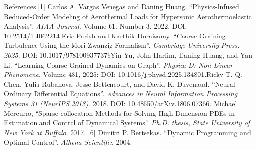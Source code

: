 \begin{frame}{References}
    \tiny
    [1] Carlos A. Vargas Venegas and Daning Huang. ``Physics-Infused Reduced-Order Modeling of Aerothermal Loads for Hypersonic Aerothermoelastic Analysis''. \emph{AIAA Journal}. Volume 61. Number 3. 2022. DOI: 10.2514/1.J062214.\newline
    [2] Eric Parish and Karthik Duraisamy. ``Coarse-Graining Turbulence Using the Mori-Zwanzig Formalism''. \emph{Cambridge University Press. 2025}. DOI: 10.1017/9781009377379\newline
    [3] Yin Yu, John Harlim, Daning Huang, and Yan Li. ``Learning Coarse-Grained Dynamics on Graph''. \emph{Physica D: Non-Linear Phenomena}. Volume 481, 2025: DOI: 10.1016/j.physd.2025.134801.\newline
    [4] Ricky T. Q. Chen, Yulia Rubanova, Jesse Bettencourt, and David K. Duvenaud. ``Neural Ordinary Differential Equations''. \emph{Advances in Neural Information Processing Systems 31 (NeurIPS 2018)}. 2018. DOI: 10.48550/arXiv.1806.07366. \newline
    [5] Michael Mercurio, ``Sparse collocation Methods for Solving High-Dimension PDEs in Estimation and Control of Dynamical Systems''. \emph{Ph.D. thesis, State University of New York at Buffalo}. 2017. 
    [6] Dimitri P. Bertsekas. ``Dynamic Programming and Optimal Control''. \emph{Athena Scientific}, 2004.
\end{frame}

